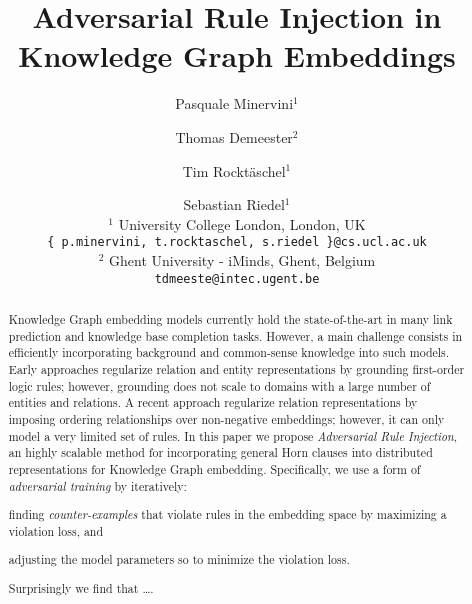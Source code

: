 \documentclass{sig-alternate-05-2015}
\title{Adversarial Rule Injection in\\Knowledge Graph Embeddings}
\author{Pasquale Minervini$^{1}$ \and Thomas Demeester$^{2}$ \and Tim Rockt\"{a}schel$^{1}$ \and Sebastian Riedel$^{1}$ \\
$^{1}$ University College London, London, UK\\
\texttt{\{ p.minervini, t.rocktaschel, s.riedel \}@cs.ucl.ac.uk} \\
$^{2}$ Ghent University - iMinds, Ghent, Belgium\\
\texttt{tdmeeste@intec.ugent.be}
}
\date{}
\begin{document}
\maketitle

\begin{abstract}
%
Knowledge Graph embedding models currently hold the state-of-the-art in many link prediction and knowledge base completion tasks.
%
However, a main challenge consists in efficiently incorporating background and common-sense knowledge into such models.
%
Early approaches regularize relation and entity representations by grounding first-order logic rules; however, grounding does not scale to domains with a large number of entities and relations.
%
A recent approach regularize relation representations by imposing ordering relationships over non-negative embeddings; however, it can only model a very limited set of rules.
%
In this paper we propose \emph{Adversarial Rule Injection}, an highly scalable method for incorporating general Horn clauses into distributed representations for Knowledge Graph embedding.
%
Specifically, we use a form of \emph{adversarial training} by iteratively:
%
\begin{inparaenum}[1)]
%
 \item finding \emph{counter-examples} that violate rules in the embedding space by maximizing a violation loss, and
%
 \item adjusting the model parameters so to minimize the violation loss.
%
\end{inparaenum}
%
Surprisingly we find that \ldots.
%
\end{abstract}













\end{document}
